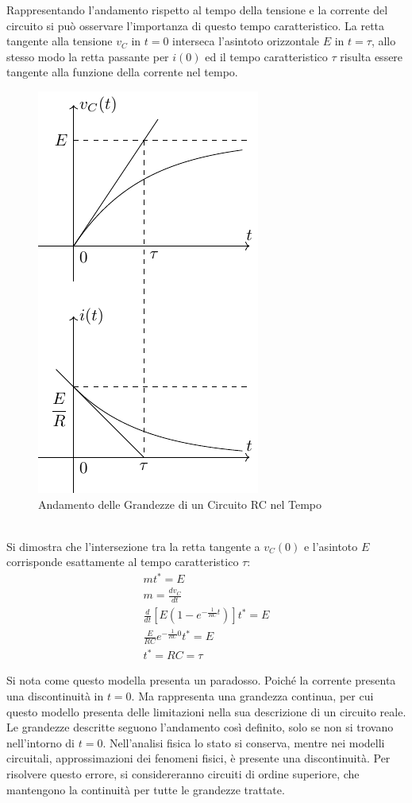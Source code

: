 \documentclass{article}
\numberwithin{equation}{subsection}
\begin{document}
Rappresentando l'andamento rispetto al tempo della tensione e la corrente del circuito si può osservare l'importanza di questo tempo caratteristico. La retta tangente alla tensione 
$v_C$ in $t=0$ interseca l'asintoto orizzontale $E$ in $t=\tau$, allo stesso modo la retta passante per $i(0)$ ed il tempo caratteristico $\tau$ risulta essere tangente alla 
funzione della corrente nel tempo. 
\begin{figure}[ht]%
    \centering
    \includegraphics{andamento-circuito-rc.pdf}
    \caption{Andamento delle Grandezze di un Circuito RC nel Tempo}
    \label{fig:andamento-rc}
\end{figure}
\\
Si dimostra che l'intersezione tra la retta tangente a $v_C(0)$ e l'asintoto $E$ corrisponde esattamente al tempo caratteristico $\tau$:
\begin{gather*}
    mt^*=E\\
    m=\displaystyle\frac{dv_C}{dt}\\
    \displaystyle\frac{d}{dt}\left[E\left(1-e^{-\frac{1}{RC}t}\right)\right]t^*=E\\
    \displaystyle\frac{E}{RC}e^{-\frac{1}{RC}0}t^*=E\\
    t^*=RC=\tau
\end{gather*}


Si nota come questo modella presenta un paradosso. Poiché la corrente presenta una discontinuità in $t=0$. Ma rappresenta una grandezza continua, per cui questo modello 
presenta delle limitazioni nella sua descrizione di un circuito reale. Le grandezze descritte seguono l'andamento così definito, solo se non si trovano nell'intorno di $t=0$. 
Nell'analisi fisica lo stato si conserva, mentre nei modelli circuitali, approssimazioni dei fenomeni fisici, è presente una discontinuità. Per risolvere questo errore, si 
considereranno circuiti di ordine superiore, che mantengono la continuità per tutte le grandezze trattate. 
\end{document}
